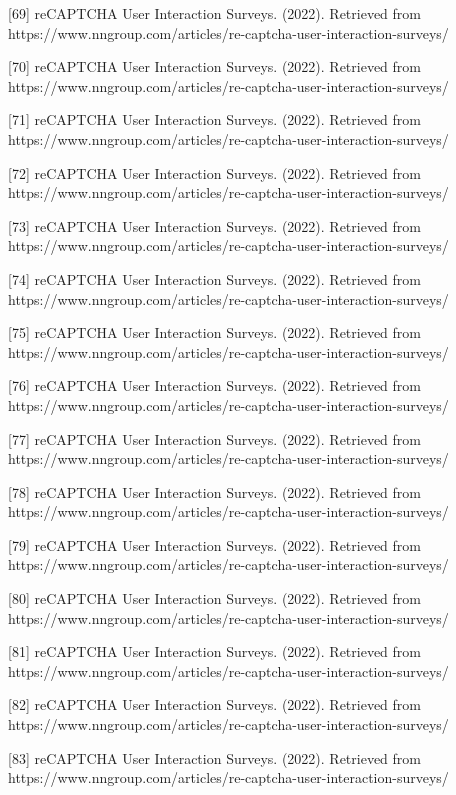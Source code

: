 [69] reCAPTCHA User Interaction Surveys. (2022). Retrieved from https://www.nngroup.com/articles/re-captcha-user-interaction-surveys/ 

[70] reCAPTCHA User Interaction Surveys. (2022). Retrieved from https://www.nngroup.com/articles/re-captcha-user-interaction-surveys/ 

[71] reCAPTCHA User Interaction Surveys. (2022). Retrieved from https://www.nngroup.com/articles/re-captcha-user-interaction-surveys/ 

[72] reCAPTCHA User Interaction Surveys. (2022). Retrieved from https://www.nngroup.com/articles/re-captcha-user-interaction-surveys/ 

[73] reCAPTCHA User Interaction Surveys. (2022). Retrieved from https://www.nngroup.com/articles/re-captcha-user-interaction-surveys/ 

[74] reCAPTCHA User Interaction Surveys. (2022). Retrieved from https://www.nngroup.com/articles/re-captcha-user-interaction-surveys/ 

[75] reCAPTCHA User Interaction Surveys. (2022). Retrieved from https://www.nngroup.com/articles/re-captcha-user-interaction-surveys/ 

[76] reCAPTCHA User Interaction Surveys. (2022). Retrieved from https://www.nngroup.com/articles/re-captcha-user-interaction-surveys/ 

[77] reCAPTCHA User Interaction Surveys. (2022). Retrieved from https://www.nngroup.com/articles/re-captcha-user-interaction-surveys/ 

[78] reCAPTCHA User Interaction Surveys. (2022). Retrieved from https://www.nngroup.com/articles/re-captcha-user-interaction-surveys/ 

[79] reCAPTCHA User Interaction Surveys. (2022). Retrieved from https://www.nngroup.com/articles/re-captcha-user-interaction-surveys/ 

[80] reCAPTCHA User Interaction Surveys. (2022). Retrieved from https://www.nngroup.com/articles/re-captcha-user-interaction-surveys/ 

[81] reCAPTCHA User Interaction Surveys. (2022). Retrieved from https://www.nngroup.com/articles/re-captcha-user-interaction-surveys/ 

[82] reCAPTCHA User Interaction Surveys. (2022). Retrieved from https://www.nngroup.com/articles/re-captcha-user-interaction-surveys/ 

[83] reCAPTCHA User Interaction Surveys. (2022). Retrieved from https://www.nngroup.com/articles/re-captcha-user-interaction-surveys/ 

